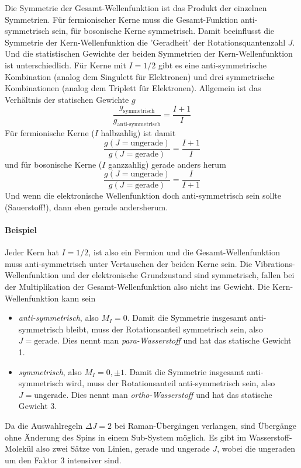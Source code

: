 Die Symmetrie der Gesamt-Wellenfunktion ist das Produkt der einzelnen Symmetrien. Für fermionischer Kerne muss die Gesamt-Funktion anti-symmetrisch sein, für bosonische Kerne symmetrisch. Damit beeinflusst die Symmetrie der Kern-Wellenfunktion die 'Geradheit' der Rotationsquantenzahl $J$. Und die statistischen Gewichte der beiden Symmetrien der Kern-Wellenfunktion ist unterschiedlich. Für Kerne mit $I = 1/2$ gibt es eine anti-symmetrische Kombination (analog dem Singulett für Elektronen) und drei symmetrische Kombinationen (analog dem Triplett für Elektronen). Allgemein ist das Verhältnis der statischen Gewichte $g$
\begin{equation}
 \frac{g_\text{symmetrisch}}{g_\text{anti-symmetrisch}} = \frac{I + 1}{I}
\end{equation}
Für fermionische Kerne ($I$ halbzahlig) ist damit 
\begin{equation}
 \frac{g(J = \text{ungerade}) }{g(J = \text{gerade})} = \frac{I + 1}{I}
\end{equation}
und für bosonische Kerne ($I$ ganzzahlig) gerade anders herum
\begin{equation}
 \frac{g(J = \text{ungerade}) }{g(J = \text{gerade})} = \frac{I}{I +1}
\end{equation}
Und wenn die elektronische Wellenfunktion  doch anti-symmetrisch sein sollte (Sauerstoff!), dann eben gerade andersherum.

\paragraph{Beispiel } Jeder Kern hat $I = 1/2$, ist also ein Fermion und die Gesamt-Wellenfunktion muss anti-symmetrisch unter Vertauschen der beiden Kerne sein. Die Vibrations-Wellenfunktion und der elektronische Grundzustand sind symmetrisch, fallen bei der Multiplikation der Gesamt-Wellenfunktion also nicht ins Gewicht. Die Kern-Wellenfunktion kann sein
\begin{itemize}
\item \emph{anti-symmetrisch}, also $M_I = 0$. Damit die Symmetrie insgesamt anti-symmetrisch bleibt, muss der Rotationsanteil symmetrisch sein, also $J = \text{gerade}$. Dies nennt man \emph{para-Wasserstoff} und hat das statische Gewicht 1.

\item \emph{symmetrisch}, also $M_I = 0, \pm 1$. Damit die Symmetrie insgesamt anti-symmetrisch wird, muss der Rotationsanteil anti-symmetrisch sein, also $J = \text{ungerade}$. Dies nennt man \emph{ortho-Wasserstoff} und hat das statische Gewicht 3.
\end{itemize}
%
Da die Auswahlregeln $\Delta J = 2$ bei Raman-Übergängen verlangen, sind Übergänge ohne Änderung des Spins in einem Sub-System möglich. Es gibt im Wasserstoff-Molekül  also zwei Sätze von Linien, gerade und ungerade $J$, wobei die ungeraden um den Faktor 3 intensiver sind.




